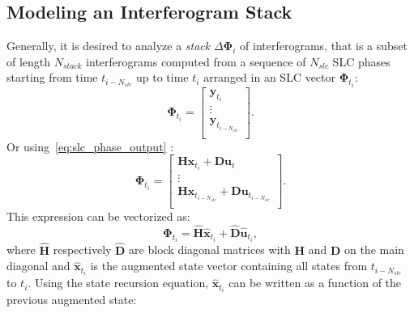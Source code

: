 \documentclass{article}
\begin{document}
\subsection{Modeling an Interferogram Stack}
Generally, it is desired to analyze a \emph{stack} $\Delta\mathbf{\Phi}_{i}$  of interferograms, that is a subset of length $N_{stack}$ interferograms computed from a sequence of $N_{slc}$ SLC phases starting from time $t_{i-N_{slc}}$ up to time $t_{i}$ arranged in an SLC vector $\mathbf{\Phi}_{t_i}$:
\begin{equation}
	\mathbf{\Phi}_{t_i} = 		\begin{bmatrix}
									\mathbf{y}_{t_{i}}\\
									\vdots\\
									\mathbf{y}_{t_{i-N_{slc}}}\\
								\end{bmatrix}.
\end{equation}
Or using~\autoref{eq:slc_phase_output} :
\begin{equation}
	\mathbf{\Phi}_{t_i} = 		\begin{bmatrix}
									\mathbf{H}\mathbf{x}_{t_{i}} + \mathbf{D}\mathbf{u}_{t}\\
									\vdots\\
									\mathbf{H}\mathbf{x}_{t_{i-N_{slc}}} + \mathbf{D}\mathbf{u}_{t_{i-N_{slc}}}\\
								\end{bmatrix}.
\end{equation}
This expression can be vectorized as:
\begin{equation}\label{eq:slc_vector}
	\mathbf{\Phi}_{t_i} = \hat{\mathbf{H}} \hat{\mathbf{x}}_{t_i} + \hat{\mathbf{D}} \hat{\mathbf{u}}_{t_i},
\end{equation}
where $\hat{\mathbf{H}}$ respectively $\hat{\mathbf{D}}$ are block diagonal matrices with $\mathbf{H}$ and $\mathbf{D}$ on the main diagonal and $\hat{\mathbf{x}}_{t_i}$ is the augmented state vector containing all states from $t_{i-N_{slc}}$ to $t_{i}$.
Using the state recursion equation, $\hat{\mathbf{x}}_{t_i}$ can be written as a function of the previous augmented state:
\end{document}
